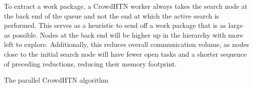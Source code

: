 To extract a work package, a CrowdHTN worker always takes the search node at the back end of the queue and not the end at which the active search is performed. This serves as a heuristic to send off a work package that is as large as possible. Nodes at the back end will be higher up in the hierarchy with more left to explore. Additionally, this reduces overall communication volume, as nodes close to the initial search node will have fewer open tasks and a shorter sequence of preceding reductions, reducing their memory footprint.
\begin{algorithm}
	\caption{The parallel CrowdHTN algorithm}
	\label{crowd: parallel algo}
\end{algorithm}
